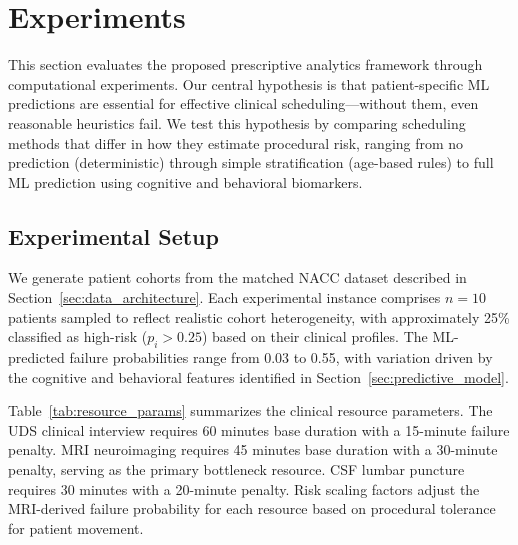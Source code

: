 

\newpage
\section{Experiments}
\label{sec:experiments}

This section evaluates the proposed prescriptive analytics framework through computational experiments. Our central hypothesis is that patient-specific ML predictions are essential for effective clinical scheduling---without them, even reasonable heuristics fail. We test this hypothesis by comparing scheduling methods that differ in how they estimate procedural risk, ranging from no prediction (deterministic) through simple stratification (age-based rules) to full ML prediction using cognitive and behavioral biomarkers.

\subsection{Experimental Setup}
\label{sec:experimental_setup}

We generate patient cohorts from the matched NACC dataset described in Section~\ref{sec:data_architecture}. Each experimental instance comprises $n = 10$ patients sampled to reflect realistic cohort heterogeneity, with approximately 25\% classified as high-risk ($p_i > 0.25$) based on their clinical profiles. The ML-predicted failure probabilities range from 0.03 to 0.55, with variation driven by the cognitive and behavioral features identified in Section~\ref{sec:predictive_model}.

Table~\ref{tab:resource_params} summarizes the clinical resource parameters. The UDS clinical interview requires 60 minutes base duration with a 15-minute failure penalty. MRI neuroimaging requires 45 minutes base duration with a 30-minute penalty, serving as the primary bottleneck resource. CSF lumbar puncture requires 30 minutes with a 20-minute penalty. Risk scaling factors adjust the MRI-derived failure probability for each resource based on procedural tolerance for patient movement.

